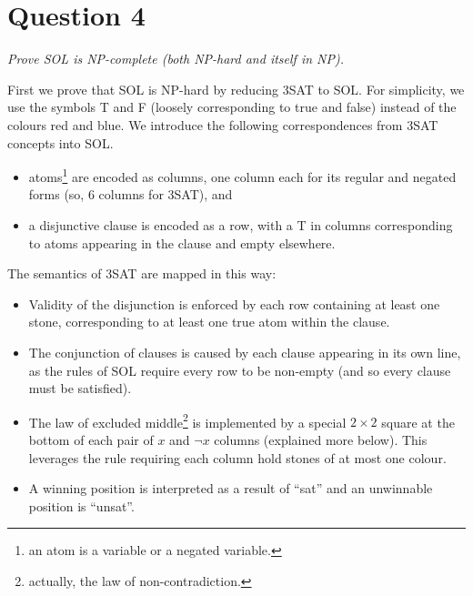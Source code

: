 \documentclass[a4paper]{article}
\begin{document}
\section*{Question 4}
\begin{center}
  \textit{
  Prove SOL  is {NP}-complete (both {NP}-hard and itself in {NP}).}
\end{center}
First we prove that SOL  is {NP}-hard by reducing 3SAT to SOL.
For simplicity, we use the symbols T and F (loosely corresponding to true and false) instead of the colours red and blue.
We introduce the following correspondences
from 3SAT concepts into SOL.
\begin{itemize}
  \setlength{\itemsep}{0pt}
  \item atoms\footnote{an atom is a variable or a negated variable.} are encoded as columns, one column each for its regular and negated forms
    (so, 6 columns for 3SAT), and
  \item a disjunctive clause is encoded as a row,
    with a T in columns corresponding to atoms appearing in the clause and empty elsewhere.
\end{itemize}
The semantics of 3SAT are mapped in this way:
\begin{itemize}
  \setlength{\itemsep}{0pt}
  \item Validity of the
    disjunction is enforced by each row containing at least one stone,
    corresponding to at least one true atom within the clause. 
  \item The conjunction of clauses is caused by each clause appearing in its own line, as 
    the rules of SOL require every row to be non-empty (and so every clause must be satisfied).
  \item The law of excluded middle\footnote{actually, the law of non-contradiction.} is implemented by a special $2\times2$
    square at the bottom of each pair of $x$ and $\neg x$ columns (explained more below).
    This leverages the rule requiring 
    each column hold stones of at most one colour. 
  \item A winning position is interpreted as a result of ``sat'' and an unwinnable
    position is ``unsat''.
\end{itemize}
\end{document}
